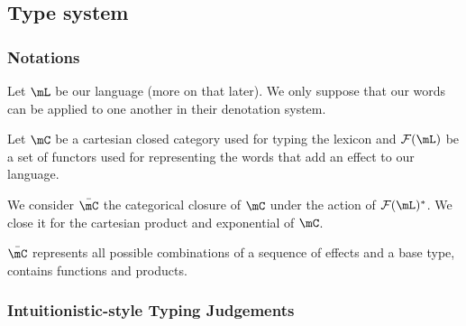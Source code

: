 \documentclass[math, english, info]{beamercours}
\begin{document}
\subsection{Type system}
\begin{frame}
	\frametitle{Notations}
	Let $\mL$ be our language (more on that later).
	We only suppose that our words can be applied to one another in their
	denotation system.

	\pause

	Let $\mC$ be a cartesian closed category used for typing the lexicon and
	$\mathcal{F}(\mL)$ be a set of functors used for representing the words
	that add an effect to our language.

	\pause\smallskip

	We consider $\bar{\mC}$ the categorical closure of $\mC$ under the action
	of $\mathcal{F}(\mL)^{*}$.
	We close it for the cartesian product and exponential of $\mC$.

	$\bar{\mC}$ represents all possible combinations of a sequence of effects
	and a base type, contains functions and products.
\end{frame}

\begin{frame}[fragile]
	\frametitle{Intuitionistic-style Typing Judgements}
\end{frame}
\end{document}

